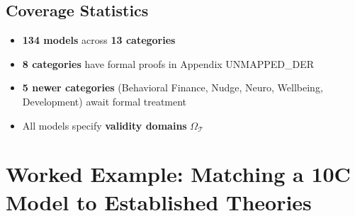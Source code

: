 \subsection{Coverage Statistics}

\begin{itemize}
    \item \textbf{134 models} across \textbf{13 categories}
    \item \textbf{8 categories} have formal proofs in Appendix UNMAPPED_DER
    \item \textbf{5 newer categories} (Behavioral Finance, Nudge, Neuro, Wellbeing,
          Development) await formal treatment
    \item All models specify \textbf{validity domains} $\Omega_\mathcal{T}$
\end{itemize}

\section{Worked Example: Matching a 10C Model to Established Theories}
\label{sec:ms-worked-example}

